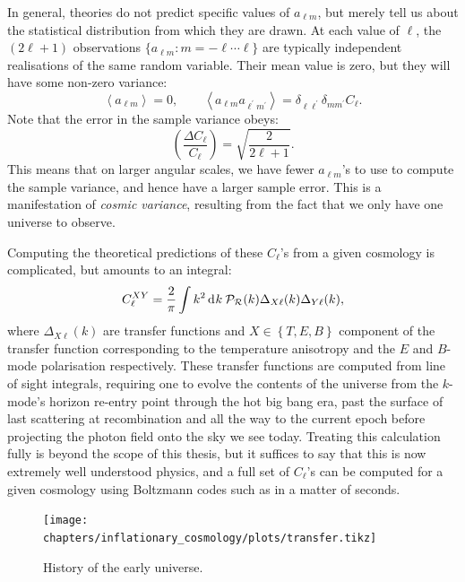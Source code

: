 In general, theories do not predict specific values of \(a_{\ell m}\), but merely tell us about the statistical distribution from which they are drawn. At each value of \(\ell\), the \((2\ell + 1)\) observations \(\{a_{\ell m}:m=-\ell\cdots\ell\}\) are typically independent realisations of the same random variable. Their mean value is zero, but they will have some non-zero variance:
\begin{equation}
  \left\langle a_{\ell m} \right\rangle = 0, \qquad
  \left\langle a_{\ell m} a_{\ell^\prime m^\prime}\right\rangle = \delta_{\ell \ell^\prime} \delta_{m m^\prime} C_\ell.
\end{equation}
Note that the error in the sample variance obeys:
\begin{equation}
  \left( \frac{\Delta C_\ell}{C_\ell} \right) = \sqrt{\frac{2}{2\ell+1}}.
\end{equation}
This means that on larger angular scales, we have fewer \(a_{\ell m}\)'s to use to compute the sample variance, and hence have a larger sample error. This is a manifestation of {\em cosmic variance}, resulting from the fact that we only have one universe to observe. 

Computing the theoretical predictions of these \(C_\ell\)'s from a given cosmology is complicated, but amounts to an integral:
\begin{equation}
  C_\ell^{XY} = \frac{2}{\pi}\int k^2 \operatorname{d}^{}\!{k} \: \mathcal{P}_\mathcal{R}(k) \Delta_{X\ell}(k)\Delta_{Y\ell}(k),
\end{equation}
where \(\Delta_{X\ell}(k)\) are transfer functions and \({X\in\left\{ T,E,B \right\}}\) component of the transfer function corresponding to the temperature anisotropy and the $E$ and $B$-mode polarisation respectively. These transfer functions are computed from line of sight integrals, requiring one to evolve the contents of the universe from the \(k\)-mode's horizon re-entry point through the hot big bang era, past the surface of last scattering at recombination and all the way to the current epoch before projecting the photon field onto the sky we see today. Treating this calculation fully is beyond the scope of this thesis, but it suffices to say that this is now extremely well understood physics, and a full set of \(C_\ell\)'s can be computed for a given cosmology using Boltzmann codes such as \CAMB{} \citep{CAMB} in a matter of seconds.

\begin{figure}[tp]
  \centering
  \texttt{[image: chapters/inflationary\_cosmology/plots/transfer.tikz]}
  \caption{History of the early universe.}\label{fig:cos:transfer}
\end{figure}

